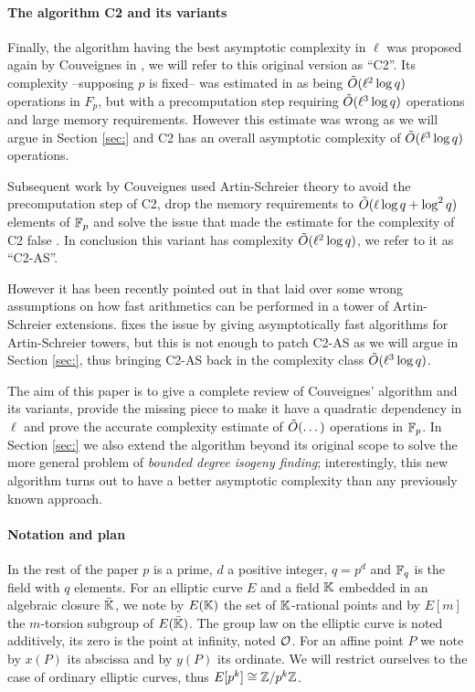 \paragraph{The algorithm C2 and its variants}
Finally, the algorithm having the best asymptotic complexity in $\ell$
was proposed again by Couveignes in \cite{Cou96}, we will refer to
this original version as ``C2''. Its complexity --supposing $p$ is
fixed-- was estimated in \cite{Cou96} as being $\tilde{O}(\ell^2\log q)$
operations in $F_p$, but with a precomputation step requiring
$\tilde{O}(\ell^3\log q)$ operations and large memory
requirements. However this estimate was wrong as we will argue in
Section \ref{sec:} and C2 has an overall asymptotic complexity of
$\tilde{O}(\ell^3\log q)$ operations.

Subsequent work by Couveignes used Artin-Schreier theory to avoid the
precomputation step of C2, drop the memory requirements to
$\tilde{O}(\ell\log q + \log^2 q)$ elements of $\mathbb{F}_p$ and solve the issue
that made the estimate for the complexity of C2 false \cite{Cou00}. In
conclusion this variant has complexity $\tilde{O}(\ell^2\log q)$, we
refer to it as ``C2-AS''.

However it has been recently pointed out in \cite{DFS09} that
\cite{Cou00} laid over some wrong assumptions on how fast arithmetics
can be performed in a tower of Artin-Schreier extensions. \cite{DFS09}
fixes the issue by giving asymptotically fast algorithms for
Artin-Schreier towers, but this is not enough to patch C2-AS as we
will argue in Section \ref{sec:}, thus bringing C2-AS back in the
complexity class $\tilde{O}(\ell^3\log q)$.

The aim of this paper is to give a complete review of Couveignes'
algorithm and its variants, provide the missing piece to make it have
a quadratic dependency in $\ell$ and prove the accurate complexity
estimate of $\tilde{O}(\dots)$ operations in $\mathbb{F}_p$. In Section
\ref{sec:} we also extend the algorithm beyond its original scope to
solve the more general problem of \emph{bounded degree isogeny
finding}; interestingly, this new algorithm turns out to have a better
asymptotic complexity than any previously known approach.

\paragraph{Notation and plan}
In the rest of the paper $p$ is a prime, $d$ a positive integer,
$q=p^d$ and $\mathbb{F}_q$ is the field with $q$ elements. For an elliptic
curve $E$ and a field $\mathbb{K}$ embedded in an algebraic closure
$\bar{\mathbb{K}}$, we note by $E(\mathbb{K})$ the set of $\mathbb{K}$-rational points and by
$E[m]$ the $m$-torsion subgroup of $E(\bar{\mathbb{K}})$. The group law on
the elliptic curve is noted additively, its zero is the point at
infinity, noted $\mathcal{O}$. For an affine point $P$ we note by $x(P)$ its
abscissa and by $y(P)$ its ordinate. We will restrict ourselves to the
case of ordinary elliptic curves, thus $E[p^k]\cong\mathbb{Z}/p^k\mathbb{Z}$.

